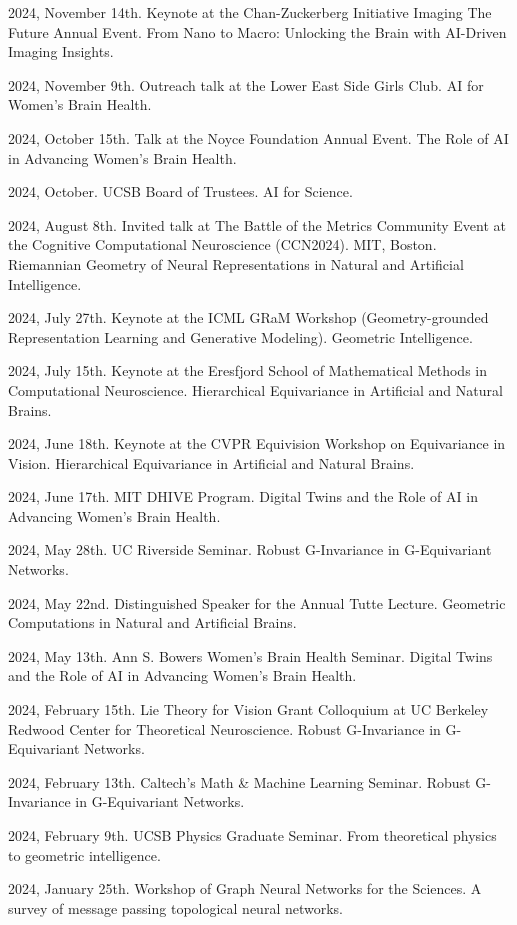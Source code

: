 2024, November 14th. Keynote at the Chan-Zuckerberg Initiative Imaging The Future Annual Event. From Nano to Macro: Unlocking the Brain with AI-Driven Imaging Insights.

2024, November 9th. Outreach talk at the Lower East Side Girls Club. AI for Women’s Brain Health.

2024, October 15th. Talk at the Noyce Foundation Annual Event. The Role of AI in Advancing Women’s Brain Health.

2024, October. UCSB Board of Trustees. AI for Science.

2024, August 8th. Invited talk at The Battle of the Metrics Community Event at the Cognitive Computational Neuroscience (CCN2024). MIT, Boston. Riemannian Geometry of Neural Representations in Natural and Artificial Intelligence.

2024, July 27th. Keynote at the ICML GRaM Workshop (Geometry-grounded Representation Learning and Generative Modeling). Geometric Intelligence.

2024, July 15th. Keynote at the Eresfjord School of Mathematical Methods in Computational Neuroscience. Hierarchical Equivariance in Artificial and Natural Brains.

2024, June 18th. Keynote at the CVPR Equivision Workshop on Equivariance in Vision. Hierarchical Equivariance in Artificial and Natural Brains.

2024, June 17th. MIT DHIVE Program. Digital Twins and the Role of AI in Advancing Women’s Brain Health.

2024, May 28th. UC Riverside Seminar. Robust G-Invariance in G-Equivariant Networks.

2024, May 22nd. Distinguished Speaker for the Annual Tutte Lecture. Geometric Computations in Natural and Artificial Brains.

2024, May 13th. Ann S. Bowers Women’s Brain Health Seminar. Digital Twins and the Role of AI in Advancing Women’s Brain Health.

2024, February 15th. Lie Theory for Vision Grant Colloquium at UC Berkeley Redwood Center for Theoretical Neuroscience. Robust G-Invariance in G-Equivariant Networks.

2024, February 13th. Caltech’s Math \& Machine Learning Seminar. Robust G-Invariance in G-Equivariant Networks.

2024, February 9th. UCSB Physics Graduate Seminar. From theoretical physics to geometric intelligence.

2024, January 25th. Workshop of Graph Neural Networks for the Sciences. A survey of message passing topological neural networks.
